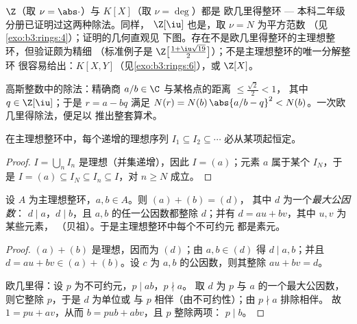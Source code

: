 \begin{example}\label{ex:b3:rings:euclidean}
$\Z$（取 $\nu = \abs\cdot$）与 $K[X]$（取 $\nu = \deg$）都是
欧几里得整环 --- 本科二年级分册已证明过这两种除法。同样，
$\Z[\iu]$ 也是，取 $\nu = N$ 为平方范数
（见\cref{exo:b3:rings:4}）；证明的几何直观见
下图。存在不是欧几里得整环的主理想整环，但验证颇为精细
（标准例子是
$\Z\bigl[\frac{1+\iu\sqrt{19}}2\bigr]$）；不是主理想整环的唯一分解整环
很容易给出：$K[X, Y]$（见\cref{exo:b3:rings:6}），或 $\Z[X]$。
\end{example}

\begin{omfigure}

{\small 高斯整数中的除法：精确商
$a/b \in \C$ 与某格点的距离 $\leq \frac{\sqrt2}{2} < 1$，
其中 $q \in \Z[\iu]$；于是 $r = a - bq$ 满足 $N(r) =
N(b)\,\abs{a/b - q}^2 < N(b)$。一次欧几里得除法，便足以
推出整套算术。}
\end{omfigure}

\begin{lemma}[主理想的升链]
\label{lem:b3:rings:acc}
在主理想整环中，每个递增的理想序列 $I_1 \subseteq I_2
\subseteq \cdots$ 必从某项起恒定。
\end{lemma}

\begin{proof}
$I = \bigcup_n I_n$ 是理想（并集递增），因此 $I =
(a)$；元素 $a$ 属于某个 $I_N$，于是 $I = (a)
\subseteq I_N \subseteq I_n \subseteq I$，对 $n \geq N$ 成立。
\end{proof}

\begin{lemma}[贝祖；欧几里得引理]\label{lem:b3:rings:bezout}
设 $A$ 为主理想整环，$a, b \in A$。则 $(a) + (b) = (d)$，
其中 $d$ 为一个\emph{最大公因数}：
$d \mid a$，$d \mid b$，且 $a,
b$ 的任一公因数都整除 $d$；并有 $d = au + bv$，其中 $u, v$ 为某些元素，
（贝祖）。于是主理想整环中每个不可约元
都是素元。
\end{lemma}

\begin{proof}
$(a) + (b)$ 是理想，因而为 $(d)$；由 $a, b \in (d)$ 得 $d \mid
a, b$；并且 $d = au + bv \in (a) + (b)$。设 $c$ 为
$a, b$ 的公因数，则其整除 $au + bv = d$。

欧几里得：设 $p$ 为不可约元，$p \mid ab$，$p \nmid a$。
取 $d$ 为 $p$ 与 $a$ 的一个最大公因数，则它整除 $p$，于是 $d$ 为单位或
与 $p$ 相伴（由不可约性）；由 $p \nmid a$ 排除相伴。
故 $1 = pu + av$，从而 $b = pub + abv$，且 $p$ 整除两项：
$p \mid b$。
\end{proof}

